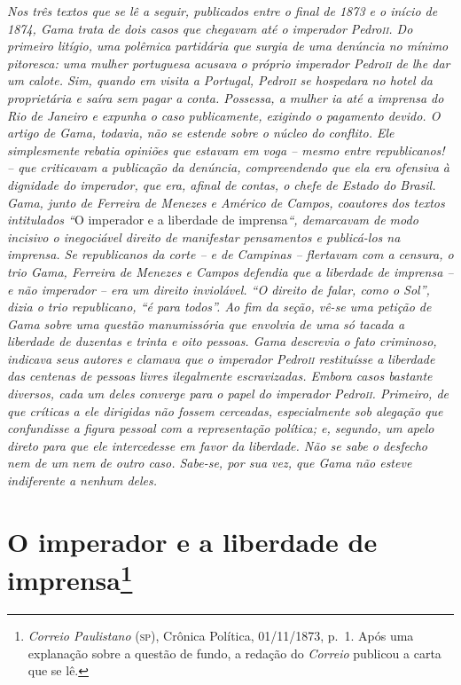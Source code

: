 \begin{argumento}
\emph{Nos três textos que se lê a seguir, publicados entre o final de
1873 e o início de 1874, Gama trata de dois casos que chegavam até o
imperador Pedro\textsc{ii}. Do primeiro litígio, uma polêmica partidária que
surgia de uma denúncia no mínimo pitoresca: uma mulher portuguesa
acusava o próprio imperador Pedro\textsc{ii} de lhe dar um calote. Sim, quando
em visita a Portugal, Pedro\textsc{ii} se hospedara no hotel da proprietária e
saíra sem pagar a conta. Possessa, a mulher ia até a imprensa do Rio de
Janeiro e expunha o caso publicamente, exigindo o pagamento devido. O
artigo de Gama, todavia, não se estende sobre o núcleo do conflito. Ele
simplesmente rebatia opiniões que estavam em voga -- mesmo entre
republicanos! -- que criticavam a publicação da denúncia, compreendendo
que ela era ofensiva à dignidade do imperador, que era, afinal de
contas, o chefe de Estado do Brasil. Gama, junto de Ferreira de Menezes
e Américo de Campos, coautores dos textos intitulados ``}O imperador e a
liberdade de imprensa\emph{``, demarcavam de modo incisivo o inegociável
direito de manifestar pensamentos e publicá-los na imprensa. Se
republicanos da corte -- e de Campinas -- flertavam com a censura, o
trio Gama, Ferreira de Menezes e Campos defendia que a liberdade de
imprensa -- e não imperador -- era um direito inviolável. ``O direito de
falar, como o Sol'', dizia o trio republicano, ``é para todos''. Ao fim da
seção, vê-se uma petição de Gama sobre uma questão manumissória que
envolvia de uma só tacada a liberdade de duzentas e trinta e oito
pessoas. Gama descrevia o fato criminoso, indicava seus autores e
clamava que o imperador Pedro\textsc{ii} restituísse a liberdade das centenas de
pessoas livres ilegalmente escravizadas. Embora casos bastante diversos,
cada um deles converge para o papel do imperador Pedro\textsc{ii}. Primeiro, de
que críticas a ele dirigidas não fossem cerceadas, especialmente sob
alegação que confundisse a figura pessoal com a representação política;
e, segundo, um apelo direto para que ele intercedesse em favor da
liberdade. Não se sabe o desfecho nem de um nem de outro caso. Sabe-se,
por sua vez, que Gama não esteve indiferente a nenhum deles.}
\end{argumento}

\chapter{O imperador e a liberdade de imprensa\footnote{\emph{Correio Paulistano} (\textsc{sp}), Crônica Política,
  01/11/1873, p.~1. Após uma explanação sobre a questão de fundo, a
  redação do \emph{Correio} publicou a carta que se lê.}} %

